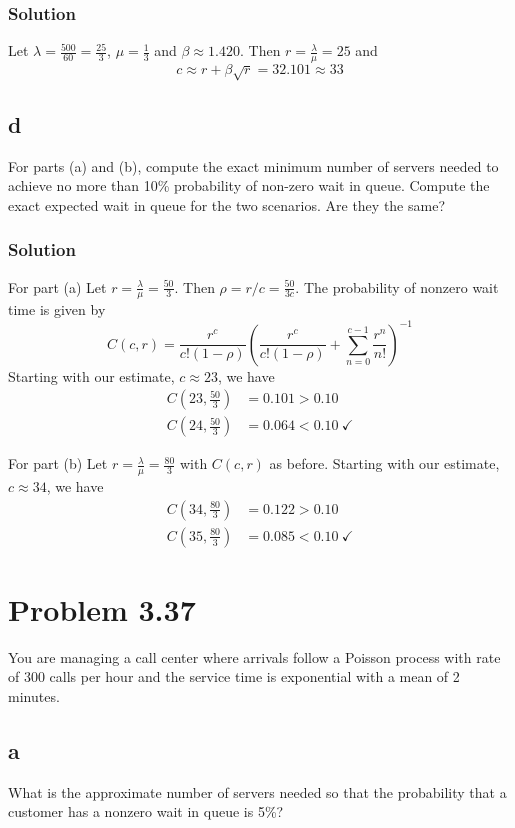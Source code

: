 \documentclass[letterpaper]{amsart}
\begin{document}
\subsubsection*{Solution}
Let $\lambda = \frac{500}{60}=\frac{25}{3}$, $\mu=\frac{1}{3}$
and $\beta\approx1.420$. Then $r=\frac{\lambda}{\mu}=25$ and
\begin{equation*}
  c\approx r + \beta\sqrt{r} = 32.101 \approx 33
\end{equation*}

\subsection*{d}
For parts (a) and (b), compute the exact minimum number of servers
needed to achieve no more than 10\% probability of non-zero wait in
queue. Compute the exact expected wait in queue for the two scenarios.
Are they the same?
\subsubsection*{Solution}
For part (a) Let $r=\frac{\lambda}{\mu}=\frac{50}{3}$. Then $\rho=r/c = \frac{50}{3c}$.
The probability of nonzero wait time is given by
\begin{equation*}
  C(c,r)=\frac{r^c}{c!(1-\rho)}\left( \frac{r^c}{c!(1-\rho)}+\sum_{n=0}^{c-1}\frac{r^n}{n!}\right)^{-1}
\end{equation*}
Starting with our estimate, $c\approx23$, we have
\begin{align*}
  C(23,\frac{50}{3}) &= 0.101 > 0.10 \\
  C(24,\frac{50}{3}) &= 0.064 < 0.10\ \checkmark
\end{align*}

For part (b) Let $r=\frac{\lambda}{\mu}=\frac{80}{3}$ with $C(c,r)$ as before.
Starting with our estimate, $c\approx34$, we have
\begin{align*}
  C(34,\frac{80}{3}) &= 0.122 > 0.10 \\
  C(35,\frac{80}{3}) &= 0.085 < 0.10\ \checkmark
\end{align*}

\section{Problem 3.37} %
You are managing a call center where arrivals follow a Poisson process with
rate of 300 calls per hour and the service time is exponential with a mean of
2 minutes.
\subsection*{a}
What is the approximate number of servers needed so that the probability that a
customer has a nonzero wait in queue is 5\%?
\end{document}
